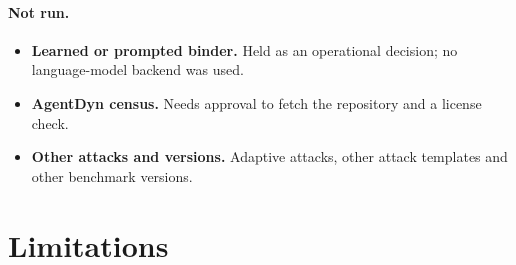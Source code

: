 \documentclass{article}
\begin{document}
\paragraph{Not run.}
\begin{itemize}
\item \textbf{Learned or prompted binder.} Held as an operational
decision; no language-model backend was used.
\item \textbf{AgentDyn census.} Needs approval to fetch the repository and a
license check.
\item \textbf{Other attacks and versions.} Adaptive attacks, other attack
templates and other benchmark versions.
\end{itemize}

\section{Limitations}
\label{sec:limits}
\end{document}
